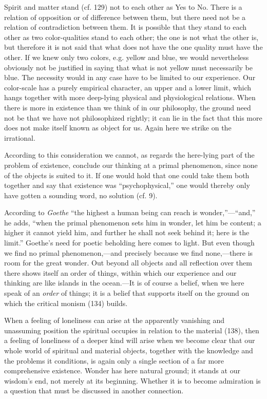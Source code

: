 \documentclass[12pt,a4paper]{book}
\newcommand{\opage}[1]{\marginnote{\footnotesize\textit{[#1]}}}
\begin{document}
Spirit and matter stand (cf. 129) not to each other as Yes to No. There is a relation of opposition or
of difference between them, but there need not be a relation of contradiction between them. It is
possible that they stand to each other as two color-qualities stand to each other; the one is not what
the other is, but therefore it is not said that what does not have the one quality must have the other.
If we knew only two colors, e.g. yellow and blue, we would nevertheless obviously not be justified in
saying that what is not yellow must necessarily be blue. The necessity would in any case have to be
limited to our experience. Our color-scale has a purely empirical character, an upper and a lower limit,
which hangs together with more deep-lying physical and physiological relations. When there is more in
existence than we think of in our philosophy, the ground need not be that we have not philosophized
rightly; it can lie in the fact that this more does not make itself known as object for us. Again here
we strike on the irrational.

According to this consideration we cannot, as regards the here-lying part of the problem of existence,
conclude our thinking at a primal phenomenon, since none of the objects is suited to it. If one would
hold that one could take them both together and say that existence was ``psychophysical,'' one would
thereby only have gotten a sounding word, no solution (cf. 9).

According to \emph{Goethe} ``the highest a human being can reach is wonder,''---``and,'' he adds, ``when
the primal phenomenon sets him in wonder, let him be content; a higher \opage{336}it cannot yield him, and further
he shall not seek behind it; here is the limit.'' Goethe's need for poetic beholding here comes to light.
But even though we find no primal phenomenon,---and precisely because we find none,---there is room for the
great wonder. Out beyond all objects and all reflection over them there shows itself an order of things,
within which our experience and our thinking are like islands in the ocean.---It is of course a belief,
when we here speak of an \emph{order} of things; it is a belief that supports itself on the ground on which
the critical monism (134) builds.

When a feeling of loneliness can arise at the apparently vanishing and unassuming position the spiritual
occupies in relation to the material (138), then a feeling of loneliness of a deeper kind will arise when
we become clear that our whole world of spiritual and material objects, together with the knowledge and
the problems it conditions, is again only a single section of a far more comprehensive existence. Wonder
has here natural ground; it stands at our wisdom's end, not merely at its beginning. Whether it is to become
admiration is a question that must be discussed in another connection.
\end{document}
